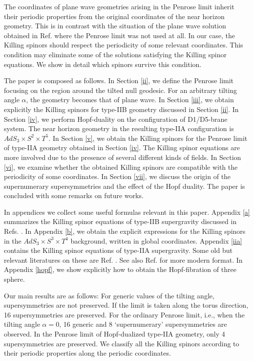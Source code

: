 \documentclass[a4paper,12pt]{article}
\begin{document}
The coordinates of plane wave geometries arising in the Penrose limit inherit their periodic properties from the original coordinates of the near horizon geometry. This is in contrast with the situation of the plane wave solution obtained in Ref. \cite{kowalski} where the Penrose limit was not used at all. In our case, the Killing spinors should respect the periodicity of some relevant coordinates. This condition may eliminate some of the solutions satisfying the Killing spinor equations. We show in detail which spinors survive this condition. 

The paper is composed as follows. In Section \ref{ii}, we define the Penrose limit focusing on the region around the tilted null geodesic. For an arbitrary tilting angle $\alpha$, the geometry becomes that of plane wave. In Section \ref{iii}, we obtain explicitly the Killing spinors for type-IIB geometry discussed in Section \ref{ii}. In Section \ref{iv}, we perform Hopf-duality on the configuration of D1/D5-brane system. The near horizon geometry in the resulting type-IIA configuration is $AdS_3\times S^2\times T^5$. In Section \ref{v}, we obtain the Killing spinors for the Penrose limit of type-IIA geometry obtained in Section \ref{iv}. The Killing spinor equations are more involved due to the presence of several different kinds of fields. In Section \ref{vi}, we examine whether the obtained Killing spinors are compatible with the periodicity of some coordinates. 
In Section \ref{vii}, we discuss the origin of the supernumerary supersymmetries and the effect of the Hopf duality. The paper is concluded with some remarks on future works.

In appendices we collect some useful formulas relevant in this paper. Appendix \ref{a} summarizes the Killing spinor equations of type-IIB supergravity discussed in Refs. \cite{schwarz,gsw}. In Appendix \ref{b}, we obtain the explicit expressions for the Killing spinors in the $AdS_3\times S^3\times T^4$ background, written in global coordinates. Appendix \ref{iia} contains the Killing spinor equations of type-IIA supergravity. Some old but relevant literatures on these are Ref. \cite{huq,giani}. See also Ref. \cite{hassan} for more modern format. In Appendix \ref{hopf}, we show explicitly how to obtain the Hopf-fibration of three sphere.  


Our main results are as follows:
For generic values of the tilting angle, supersymmetries are not preserved. If the limit is taken along the torus direction, 16 supersymmetries are preserved. For the ordinary Penrose limit, i.e., when the tilting angle $\alpha=0$, 16 generic and 8 `supernumerary' supersymmetries are observed. In the Penrose limit of Hopf-dualized type-IIA geometry, only 4 supersymmetries are preserved. We classify all the Killing spinors according to their periodic properties along the periodic coordinates. 
\end{document}
